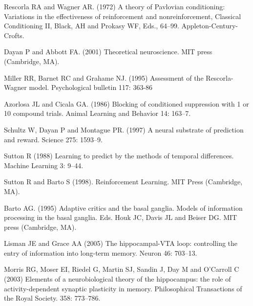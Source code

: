 \documentclass[11pt,a4paper]{scrartcl}
\begin{document}
\begin{thebibliography}{10}

Rescorla RA and Wagner AR. (1972) A theory of Pavlovian conditioning: Variations in the effectiveness of reinforcement and nonreinforcement, 
\newblock Classical Conditioning II, Black, AH and Prokasy WF, Eds., 64--99. Appleton-Century-Crofts.

Dayan P and Abbott FA. (2001) Theoretical neuroscience. 
\newblock  MIT press (Cambridge, MA).

Miller RR, Barnet RC and Grahame NJ. (1995) Assessment of the Rescorla-Wagner model.
\newblock Psychological bulletin 117: 363-86

Azorlosa JL and Cicala GA. (1986) Blocking of conditioned suppression with 1 or 10 compound trials.
\newblock Animal Learning and Behavior 14: 163--7.

Schultz W, Dayan P and Montague PR. (1997) A neural substrate of prediction and reward.
\newblock Science 275: 1593--9.

Sutton R (1988) Learning to predict by the methods of temporal differences.
\newblock Machine Learning 3: 9--44.

Sutton R and Barto S (1998). Reinforcement Learning.
\newblock MIT Press (Cambridge, MA).

Barto AG. (1995) Adaptive critics and the basal ganglia.
\newblock Models of information processing in the basal ganglia. Eds.
Houk JC, Davis JL and Beiser DG. MIT press (Cambridge, MA).

Lisman JE and Grace AA (2005) The hippocampal-VTA loop: controlling the entry of information into long-term memory.
\newblock Neuron 46: 703--13.

Morris RG, Moser EI, Riedel G, Martin SJ, Sandin J, Day M and O’Carroll C (2003) Elements of a neurobiological theory
of the hippocampus: the role of activity-dependent synaptic plasticity in memory. 
\newblock Philosophical Transactions of the Royal Society. 358: 773--786.

\end{thebibliography}
\end{document}
